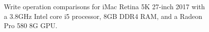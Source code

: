 \begin{figure}[!htb]
\centering
{}


\caption{Write operation comparisons for iMac Retina 5K 27-inch 2017 with a 3.8GHz Intel core i5 processor, 8GB DDR4 RAM, and a Radeon Pro 580 8G GPU.
\label{fig:perf-imac-write}}
\end{figure}





